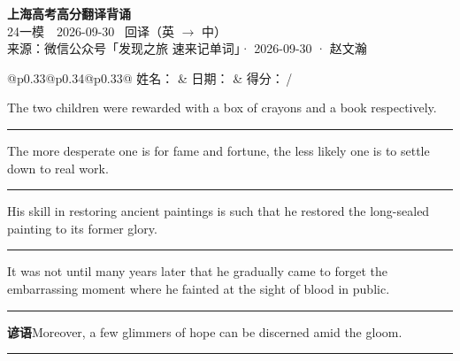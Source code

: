 \documentclass[11pt,a4paper]{article}
\newcommand{\num}[1]{\makebox[1.9em][r]{#1.}\hspace{0.3em}}
\newcommand{\wline}{\noindent\rule{\linewidth}{0.4pt}}
\begin{document}
\pagestyle{plain}
\begin{center}
{\LARGE\bfseries 上海高考高分翻译背诵 }\\[0.25em]
{\large 24一模　2026-09-30 \quad\ 回译（英 $\to$ 中）}\\[0.35em]
{\footnotesize 来源：微信公众号「发现之旅 速来记单词」· 2026-09-30 · 赵文瀚}
\end{center}

\vspace{0.4em}
\noindent\begin{tabular}{@{}p{0.33\textwidth}@{}p{0.34\textwidth}@{}p{0.33\textwidth}@{}}
姓名：\underline{\hspace{2.0cm}} & 日期：\underline{\hspace{2.0cm}} & 得分：\underline{\hspace{1.4cm}}\,/ \\
\end{tabular}

\vspace{0.5em}

\vspace{0.8em}
\num{1}The two children were rewarded with a box of crayons and a book respectively.

\vspace{0.25em}

\wline

\num{2}The more desperate one is for fame and fortune, the less likely one is to settle down to real work.

\vspace{0.25em}

\wline

\num{3}His skill in restoring ancient paintings is such that he restored the long-sealed painting to its former glory.

\vspace{0.25em}

\wline

\num{4}It was not until many years later that he gradually came to forget the embarrassing moment where he fainted at the sight of blood in public.

\vspace{0.25em}

\wline

\vspace{0.4em}\noindent{\color{rulegray}\rule{\textwidth}{0.6pt}}\vspace{0.4em}

\num{5}\textbf{谚语}\quad Moreover, a few glimmers of hope can be discerned amid the gloom.

\vspace{0.25em}

\wline
\end{document}
